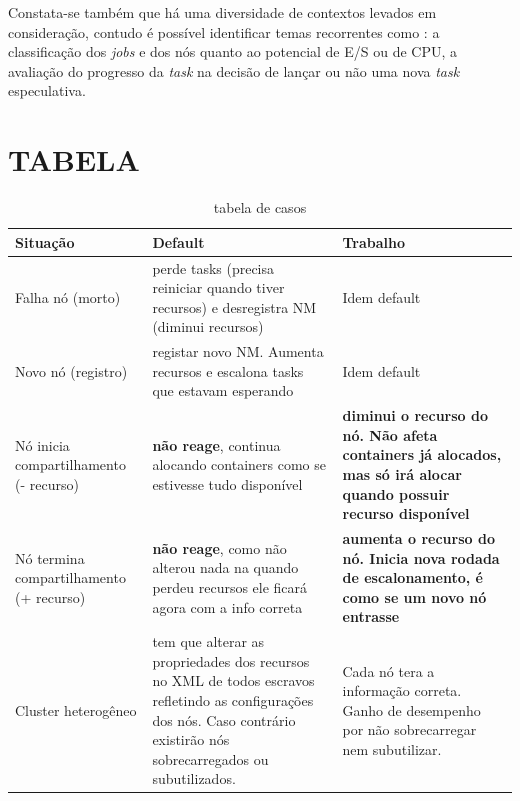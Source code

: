 Constata-se também que há uma diversidade de contextos levados em consideração, contudo é possível identificar temas recorrentes como : a classificação dos \emph{jobs} e dos nós quanto ao potencial de E/S ou de CPU, a avaliação do progresso da \emph{task} na decisão de lançar ou não uma nova \emph{task} especulativa.


\section{TABELA}
\begin{table}
	\centering
	\begin{tabular}{|p{3.0cm}|p{6.0cm}|p{6.0cm}|}
		\hline
		Situação & Default & Trabalho \\
		\hline
		Falha nó (morto) & perde tasks (precisa reiniciar quando tiver recursos) e desregistra NM (diminui recursos) & Idem default\\
		\hline
		Novo nó (registro) & registar novo NM. Aumenta recursos e escalona tasks que estavam esperando & Idem default\\
		\hline
		Nó inicia compartilhamento (- recurso) & \textbf{não reage}, continua alocando containers como se estivesse tudo disponível & \textbf{diminui o recurso do nó. Não afeta containers já alocados, mas só irá alocar quando possuir recurso disponível}\\
		\hline
		Nó termina compartilhamento (+ recurso) &\textbf{não reage}, como não alterou nada na quando perdeu recursos ele ficará agora com a info correta & \textbf{aumenta o recurso do nó. Inicia nova rodada de escalonamento, é como se um novo nó entrasse}\\
		\hline
		Cluster heterogêneo & tem que alterar as propriedades dos recursos no XML de todos escravos refletindo as configurações dos nós. Caso contrário existirão nós sobrecarregados ou subutilizados. & Cada nó tera a informação correta. Ganho de desempenho por não sobrecarregar nem subutilizar.\\
		\hline
		
	\end{tabular}
	\caption{tabela de casos}
	\label{tab:memory allocation}
\end{table}

